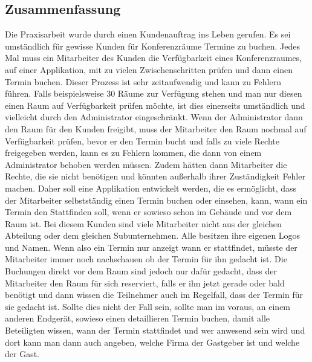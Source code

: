 
\subsection{Zusammenfassung}
Die Praxisarbeit wurde durch einen Kundenauftrag ins Leben gerufen.
Es sei umständlich für gewisse Kunden für Konferenzräume Termine zu buchen.
Jedes Mal muss ein Mitarbeiter des Kunden die Verfügbarkeit eines Konferenzraumes, auf einer Applikation, mit zu vielen Zwischenschritten prüfen und dann einen Termin buchen.
Dieser Prozess ist sehr zeitaufwendig und kann zu Fehlern führen.
Falls beispielsweise 30 Räume zur Verfügung stehen und man nur diesen einen Raum auf Verfügbarkeit prüfen möchte, ist dies einerseits umständlich und vielleicht durch den Administrator eingeschränkt.
Wenn der Administrator dann den Raum für den Kunden freigibt, muss der Mitarbeiter den Raum nochmal auf Verfügbarkeit prüfen, bevor er den Termin bucht und falls zu viele Rechte freigegeben werden, kann es zu Fehlern kommen,
die dann von einem Administrator behoben werden müssen.
Zudem hätten dann Mitarbeiter die Rechte, die sie nicht benötigen und könnten außerhalb ihrer Zuständigkeit Fehler machen.
Daher soll eine Applikation entwickelt werden, die es ermöglicht, dass der Mitarbeiter selbstständig einen Termin buchen oder einsehen, kann, wann ein Termin den Stattfinden soll, wenn er sowieso schon im Gebäude und vor dem Raum ist.
\newline
Bei diesem Kunden sind viele Mitarbeiter nicht aus der gleichen Abteilung oder dem gleichen Subunternehmen.
Alle besitzen ihre eigenen Logos und Namen.
Wenn also ein Termin nur anzeigt wann er stattfindet, müsste der Mitarbeiter immer noch nachschauen ob der Termin für ihn gedacht ist.
Die Buchungen direkt vor dem Raum sind jedoch nur dafür gedacht, dass der Mitarbeiter den Raum für sich reserviert, falls er ihn jetzt gerade oder bald benötigt und dann wissen die Teilnehmer auch im Regelfall, dass der Termin für sie gedacht ist.
\newline
Sollte dies nicht der Fall sein, sollte man im voraus, an einem anderen Endgerät, sowieso einen detaillieren Termin buchen, damit alle Beteiligten wissen, wann der Termin stattfindet und wer anwesend sein wird und dort kann man dann auch angeben, welche Firma der Gastgeber ist und welche der Gast.
